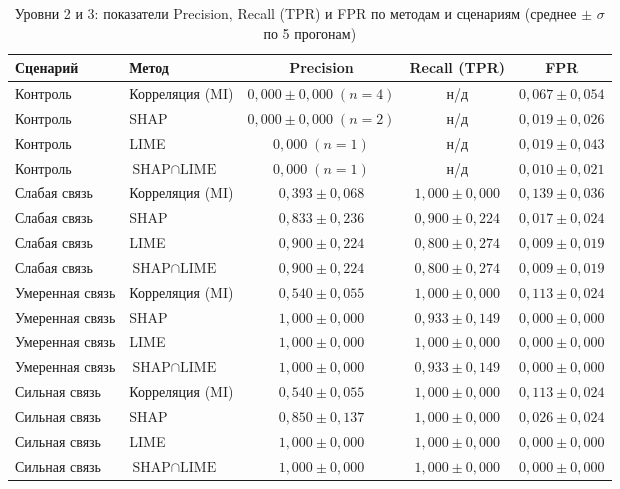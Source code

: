 \documentclass{misisarticle}
\begin{document}
\begin{table}[t]
\centering
\caption{Уровни 2 и 3: показатели Precision, Recall (TPR) и FPR по методам и сценариям (среднее $\pm$ $\sigma$ по 5 прогонам)}
\label{tab:detection}
\footnotesize
\begin{tabular}{@{} l l c c c @{}}
\toprule
Сценарий & Метод & Precision & Recall (TPR) & FPR \\
\midrule
Контроль & Корреляция (MI) & $0{,}000 \pm 0{,}000\;(n=4)$ & н/д & $0{,}067 \pm 0{,}054$ \\
Контроль & SHAP & $0{,}000 \pm 0{,}000\;(n=2)$ & н/д & $0{,}019 \pm 0{,}026$ \\
Контроль & LIME & $0{,}000\;(n=1)$ & н/д & $0{,}019 \pm 0{,}043$ \\
Контроль & $\text{SHAP} \cap \text{LIME}$ & $0{,}000\;(n=1)$ & н/д & $0{,}010 \pm 0{,}021$ \\
\midrule
Слабая связь & Корреляция (MI) & $0{,}393 \pm 0{,}068$ & $1{,}000 \pm 0{,}000$ & $0{,}139 \pm 0{,}036$ \\
Слабая связь & SHAP & $0{,}833 \pm 0{,}236$ & $0{,}900 \pm 0{,}224$ & $0{,}017 \pm 0{,}024$ \\
Слабая связь & LIME & $0{,}900 \pm 0{,}224$ & $0{,}800 \pm 0{,}274$ & $0{,}009 \pm 0{,}019$ \\
Слабая связь & $\text{SHAP} \cap \text{LIME}$ & $0{,}900 \pm 0{,}224$ & $0{,}800 \pm 0{,}274$ & $0{,}009 \pm 0{,}019$ \\
\midrule
Умеренная связь & Корреляция (MI) & $0{,}540 \pm 0{,}055$ & $1{,}000 \pm 0{,}000$ & $0{,}113 \pm 0{,}024$ \\
Умеренная связь & SHAP & $1{,}000 \pm 0{,}000$ & $0{,}933 \pm 0{,}149$ & $0{,}000 \pm 0{,}000$ \\
Умеренная связь & LIME & $1{,}000 \pm 0{,}000$ & $1{,}000 \pm 0{,}000$ & $0{,}000 \pm 0{,}000$ \\
Умеренная связь & $\text{SHAP} \cap \text{LIME}$ & $1{,}000 \pm 0{,}000$ & $0{,}933 \pm 0{,}149$ & $0{,}000 \pm 0{,}000$ \\
\midrule
Сильная связь & Корреляция (MI) & $0{,}540 \pm 0{,}055$ & $1{,}000 \pm 0{,}000$ & $0{,}113 \pm 0{,}024$ \\
Сильная связь & SHAP & $0{,}850 \pm 0{,}137$ & $1{,}000 \pm 0{,}000$ & $0{,}026 \pm 0{,}024$ \\
Сильная связь & LIME & $1{,}000 \pm 0{,}000$ & $1{,}000 \pm 0{,}000$ & $0{,}000 \pm 0{,}000$ \\
Сильная связь & $\text{SHAP} \cap \text{LIME}$ & $1{,}000 \pm 0{,}000$ & $1{,}000 \pm 0{,}000$ & $0{,}000 \pm 0{,}000$ \\
\bottomrule
\end{tabular}
\end{table}
\end{document}
